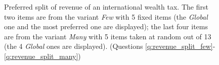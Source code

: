 \documentclass[12pt,english]{article}
\begin{document}
\begin{bibunit}
\begin{figure}[h!]
\end{figure}
\begin{figure}
  \caption[Preferred split of revenue of an international wealth tax]{Preferred split of revenue of an international wealth tax. The first two items are from the variant \textit{Few} with 5 fixed items (the \textit{Global} one and the most preferred one are displayed); the last four items are from the variant \textit{Many} with 5 items taken at random out of 13 (the 4 \textit{Global} ones are displayed). \hfill (Questions \ref{q:revenue_split_few}-\ref{q:revenue_split_many})} \label{fig:split}



\end{figure}
\end{bibunit}
\end{document}
